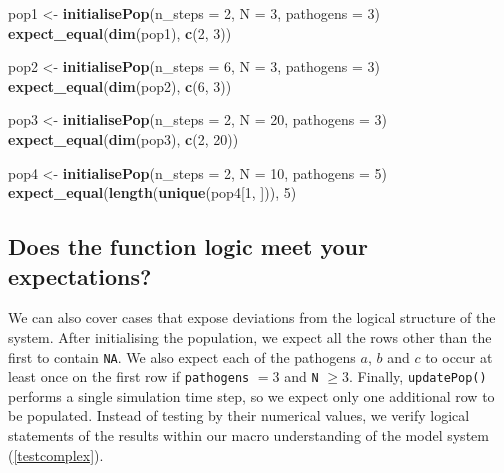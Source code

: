 \documentclass[
]{article}
\newenvironment{Shaded}{\begin{snugshade}}{\end{snugshade}}
\newcommand{\DataTypeTok}[1]{\textcolor[rgb]{0.13,0.29,0.53}{#1}}
\newcommand{\DecValTok}[1]{\textcolor[rgb]{0.00,0.00,0.81}{#1}}
\newcommand{\KeywordTok}[1]{\textcolor[rgb]{0.13,0.29,0.53}{\textbf{#1}}}
\newcommand{\NormalTok}[1]{#1}
\newcommand{\StringTok}[1]{\textcolor[rgb]{0.31,0.60,0.02}{#1}}
\begin{document}
\begin{Shaded}
\begin{Highlighting}[]
\NormalTok{pop1 <-}\StringTok{ }\KeywordTok{initialisePop}\NormalTok{(}\DataTypeTok{n_steps =} \DecValTok{2}\NormalTok{, }\DataTypeTok{N =} \DecValTok{3}\NormalTok{, }\DataTypeTok{pathogens =} \DecValTok{3}\NormalTok{) }
\KeywordTok{expect_equal}\NormalTok{(}\KeywordTok{dim}\NormalTok{(pop1), }\KeywordTok{c}\NormalTok{(}\DecValTok{2}\NormalTok{, }\DecValTok{3}\NormalTok{))}

\NormalTok{pop2 <-}\StringTok{ }\KeywordTok{initialisePop}\NormalTok{(}\DataTypeTok{n_steps =} \DecValTok{6}\NormalTok{, }\DataTypeTok{N =} \DecValTok{3}\NormalTok{, }\DataTypeTok{pathogens =} \DecValTok{3}\NormalTok{) }
\KeywordTok{expect_equal}\NormalTok{(}\KeywordTok{dim}\NormalTok{(pop2), }\KeywordTok{c}\NormalTok{(}\DecValTok{6}\NormalTok{, }\DecValTok{3}\NormalTok{))}

\NormalTok{pop3 <-}\StringTok{ }\KeywordTok{initialisePop}\NormalTok{(}\DataTypeTok{n_steps =} \DecValTok{2}\NormalTok{, }\DataTypeTok{N =} \DecValTok{20}\NormalTok{, }\DataTypeTok{pathogens =} \DecValTok{3}\NormalTok{) }
\KeywordTok{expect_equal}\NormalTok{(}\KeywordTok{dim}\NormalTok{(pop3), }\KeywordTok{c}\NormalTok{(}\DecValTok{2}\NormalTok{, }\DecValTok{20}\NormalTok{))}

\NormalTok{pop4 <-}\StringTok{ }\KeywordTok{initialisePop}\NormalTok{(}\DataTypeTok{n_steps =} \DecValTok{2}\NormalTok{, }\DataTypeTok{N =} \DecValTok{10}\NormalTok{, }\DataTypeTok{pathogens =} \DecValTok{5}\NormalTok{) }
\KeywordTok{expect_equal}\NormalTok{(}\KeywordTok{length}\NormalTok{(}\KeywordTok{unique}\NormalTok{(pop4[}\DecValTok{1}\NormalTok{, ])), }\DecValTok{5}\NormalTok{)}
\end{Highlighting}
\end{Shaded}

\hypertarget{complexcases}{%
\subsection*{Does the function logic meet your expectations?}\label{complexcases}}

We can also cover cases that expose deviations from the logical structure of the system.
After initialising the population, we expect all the rows other than the first to contain \texttt{NA}.
We also expect each of the pathogens \(a\), \(b\) and \(c\) to occur at least once on the first row if \texttt{pathogens} \(= 3\) and \texttt{N} \(\geq 3\).
Finally, \texttt{updatePop()} performs a single simulation time step, so we expect only one additional row to be populated.
Instead of testing by their numerical values, we verify logical statements of the results within our macro understanding of the model system (\ref{testcomplex}).
\newline
{}\label{testcomplex}
\end{document}
